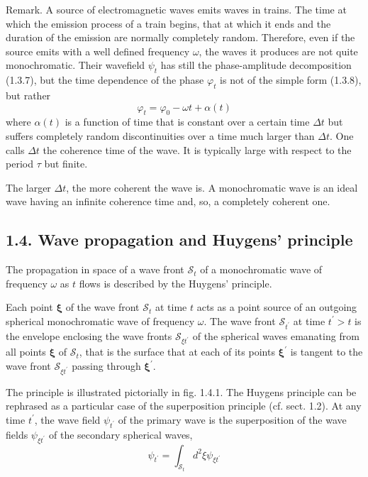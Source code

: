 \documentclass{article}
\begin{document}
Remark. A source of electromagnetic waves emits waves in trains. The time at which the emission process of a train begins, that at which it ends and the duration of the emission are normally completely random. Therefore, even if the source emits with a well defined frequency $\omega$, the waves it produces are not quite monochromatic. Their wavefield $\psi_{t}$ has still the phase-amplitude decomposition (1.3.7), but the time dependence of the phase $\varphi_{t}$ is not of the simple form (1.3.8), but rather
$$
\begin{equation*}
\varphi_{t}=\varphi_{0}-\omega t+\alpha(t) \tag{1.3.24}
\end{equation*}
$$
where $\alpha(t)$ is a function of time that is constant over a certain time $\Delta t$ but suffers completely random discontinuities over a time much larger than $\Delta t$. One calls $\Delta t$ the coherence time of the wave. It is typically large with respect to the period $\tau$ but finite.

The larger $\Delta t$, the more coherent the wave is. A monochromatic wave is an ideal wave having an infinite coherence time and, so, a completely coherent one.

\subsection*{1.4. Wave propagation and Huygens' principle}

The propagation in space of a wave front $\mathcal{S}_{t}$ of a monochromatic wave of frequency $\omega$ as $t$ flows is described by the Huygens' principle.

Each point $\boldsymbol{\xi}$ of the wave front $\mathcal{S}_{t}$ at time $t$ acts as a point source of an outgoing spherical monochromatic wave of frequency $\omega$. The wave front $\mathcal{S}_{t^{\prime}}$ at time $t^{\prime}>t$ is the envelope enclosing the wave fronts $\mathcal{S}_{\xi t^{\prime}}$ of the spherical waves emanating from all points $\boldsymbol{\xi}$ of $\mathcal{S}_{t}$, that is the surface that at each of its points $\boldsymbol{\xi}^{\prime}$ is tangent to the wave front $\mathcal{S}_{\xi t^{\prime}}$ passing through $\boldsymbol{\xi}^{\prime}$.

The principle is illustrated pictorially in fig. 1.4.1.
The Huygens principle can be rephrased as a particular case of the superposition principle (cf. sect. 1.2). At any time $t^{\prime}$, the wave field $\psi_{t^{\prime}}$ of the primary wave is the superposition of the wave fields $\psi_{\xi t^{\prime}}$ of the secondary spherical waves,
$$
\begin{equation*}
\psi_{t^{\prime}}=\int_{\mathcal{S}_{t}} d^{2} \xi \psi_{\xi t^{\prime}} \tag{1.4.1}
\end{equation*}
$$
\end{document}
